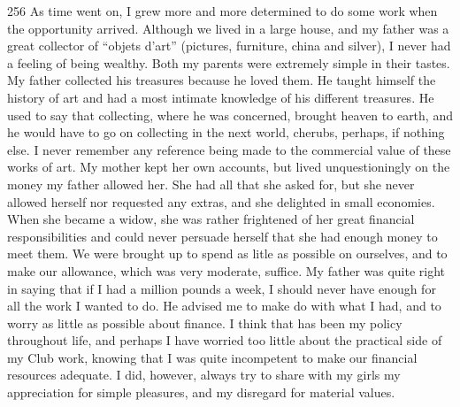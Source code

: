 \begin{tp}{256}
As time went on, I grew more and more determined to
do some work when the opportunity arrived. Although
we lived in a large house, and my father was a great
collector of “objets d’art” (pictures, furniture, china and
silver), I never had a feeling of being wealthy. Both my
parents were extremely simple in their tastes. My father
collected his treasures because he loved them. He taught
himself the history of art and had a most intimate knowledge
of his different treasures. He used to say that
collecting, where he was concerned, brought heaven to earth,
and he would have to go on collecting in the next world,
cherubs, perhaps, if nothing else. I never remember any
reference being made to the commercial value of these
works of art. My mother kept her own accounts, but lived
unquestioningly on the money my father allowed her. She
had all that she asked for, but she never allowed herself
nor requested any extras, and she delighted in small
economies. When she became a widow, she was rather
frightened of her great financial responsibilities and could
never persuade herself that she had enough money to
meet them. We were brought up to spend as litle as
possible on ourselves, and to make our allowance, which
was very moderate, suffice. My father was quite right
in saying that if I had a million pounds a week, I should
never have enough for all the work I wanted to do. He
advised me to make do with what I had, and to worry
as little as possible about finance. I think that has been
my policy throughout life, and perhaps I have worried
too little about the practical side of my Club work, knowing
that I was quite incompetent to make our financial
resources adequate. I did, however, always try to share
with my girls my appreciation for simple pleasures, and
my disregard for material values.
\end{tp}

